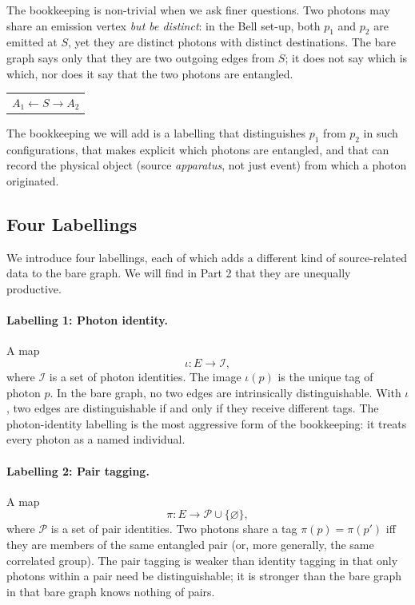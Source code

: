 \documentclass[11pt]{article}
\begin{document}
The bookkeeping is non-trivial when we ask finer questions. Two photons may share an emission vertex \emph{but be distinct}: in the Bell set-up, both $p_1$ and $p_2$ are emitted at $S$, yet they are distinct photons with distinct destinations. The bare graph says only that they are two outgoing edges from $S$; it does not say which is which, nor does it say that the two photons are entangled.

\begin{center}
\begin{tabular}{c}
$A_1 \leftarrow S \rightarrow A_2$ \\
\end{tabular}
\end{center}

The bookkeeping we will add is a labelling that distinguishes $p_1$ from $p_2$ in such configurations, that makes explicit which photons are entangled, and that can record the physical object (source \emph{apparatus}, not just event) from which a photon originated.

\subsection{Four Labellings}

We introduce four labellings, each of which adds a different kind of source-related data to the bare graph. We will find in Part 2 that they are unequally productive.

\paragraph{Labelling 1: Photon identity.} A map
\[
\iota : E \to \mathcal{I},
\]
where $\mathcal{I}$ is a set of photon identities. The image $\iota(p)$ is the unique tag of photon $p$. In the bare graph, no two edges are intrinsically distinguishable. With $\iota$, two edges are distinguishable if and only if they receive different tags. The photon-identity labelling is the most aggressive form of the bookkeeping: it treats every photon as a named individual.

\paragraph{Labelling 2: Pair tagging.} A map
\[
\pi : E \to \mathcal{P} \cup \{\varnothing\},
\]
where $\mathcal{P}$ is a set of pair identities. Two photons share a tag $\pi(p) = \pi(p')$ iff they are members of the same entangled pair (or, more generally, the same correlated group). The pair tagging is weaker than identity tagging in that only photons within a pair need be distinguishable; it is stronger than the bare graph in that bare graph knows nothing of pairs.
\end{document}
